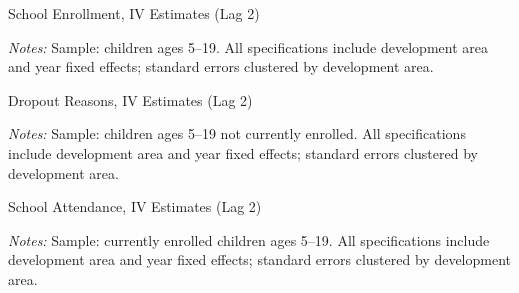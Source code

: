 \documentclass[12pt]{article}
\newcommand*{\TableLagTwoPath}{../Paper_3_Tables/Lagged_2Year_Tables}
\begin{document}
	\begin{table}[H]
	\centering
	\begin{adjustbox}{max width=\linewidth, center}
	\begin{threeparttable}
		\caption{School Enrollment, IV Estimates (Lag 2)}
		\label{tab:enrollment_lag2}
		{\small}
		\begin{tablenotes}
			\small
			\item \textit{Notes:} Sample: children ages 5--19. All specifications include development area and year fixed effects; standard errors clustered by development area.
		\end{tablenotes}
	\end{threeparttable}
	\end{adjustbox}
	\end{table}
	\begin{table}[H]
	\centering
	\begin{adjustbox}{max width=\linewidth, center}
	\begin{threeparttable}
		\caption{Dropout Reasons, IV Estimates (Lag 2)}
		\label{tab:dropout_reasons_lag2}
		{\small}
		\begin{tablenotes}
			\small
			\item \textit{Notes:} Sample: children ages 5--19 not currently enrolled. All specifications include development area and year fixed effects; standard errors clustered by development area.
		\end{tablenotes}
	\end{threeparttable}
	\end{adjustbox}
	\end{table}
	\begin{table}[H]
	\centering
	\begin{adjustbox}{max width=\linewidth, center}
	\begin{threeparttable}
		\caption{School Attendance, IV Estimates (Lag 2)}
		\label{tab:attendance_levels_lag2}
		{\small}
		\begin{tablenotes}
			\small
			\item \textit{Notes:} Sample: currently enrolled children ages 5--19. All specifications include development area and year fixed effects; standard errors clustered by development area.
		\end{tablenotes}
	\end{threeparttable}
	\end{adjustbox}
	\end{table}
\end{document}
